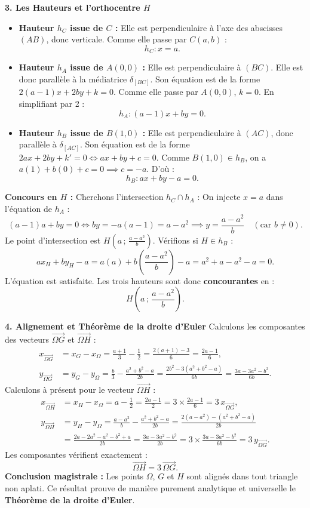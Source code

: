 \documentclass[11pt,a4paper]{article}
\newcommand{\vect}[1]{\overrightarrow{#1}}
\begin{document}
\begin{correctionbox}
\textbf{3. Les Hauteurs et l'orthocentre $H$}
\begin{itemize}[leftmargin=1cm]
    \item \textbf{Hauteur $h_C$ issue de $C$ :} Elle est perpendiculaire à l'axe des abscisses $(AB)$, donc verticale. Comme elle passe par $C(a, b)$ :
    \[
    h_C : x = a.
    \]
    \item \textbf{Hauteur $h_A$ issue de $A(0,0)$ :} Elle est perpendiculaire à $(BC)$. Elle est donc parallèle à la médiatrice $\delta_{[BC]}$. Son équation est de la forme $2(a-1)x + 2by + k = 0$. Comme elle passe par $A(0,0)$, $k = 0$. En simplifiant par 2 :
    \[
    h_A : (a - 1)x + by = 0.
    \]
    \item \textbf{Hauteur $h_B$ issue de $B(1,0)$ :} Elle est perpendiculaire à $(AC)$, donc parallèle à $\delta_{[AC]}$. Son équation est de la forme $2ax + 2by + k' = 0 \iff ax + by + c = 0$.
    Comme $B(1,0) \in h_B$, on a $a(1) + b(0) + c = 0 \implies c = -a$. D'où :
    \[
    h_B : ax + by - a = 0.
    \]
\end{itemize}
\textbf{Concours en $H$ :} Cherchons l'intersection $h_C \cap h_A$ :
On injecte $x = a$ dans l'équation de $h_A$ :
\[
(a - 1)a + by = 0 \iff by = -a(a - 1) = a - a^2 \implies y = \frac{a - a^2}{b} \quad (\text{car } b \neq 0).
\]
Le point d'intersection est $H\left(a \,;\, \frac{a - a^2}{b}\right)$.
Vérifions si $H \in h_B$ :
\[
ax_H + by_H - a = a(a) + b\left(\frac{a - a^2}{b}\right) - a = a^2 + a - a^2 - a = 0.
\]
L'équation est satisfaite. Les trois hauteurs sont donc \textbf{concourantes} en :
\[
H\left(a \,;\, \frac{a - a^2}{b}\right).
\]

\textbf{4. Alignement et Théorème de la droite d'Euler}
Calculons les composantes des vecteurs $\vect{\Omega G}$ et $\vect{\Omega H}$ :
\begin{align*}
x_{\vect{\Omega G}} &= x_G - x_\Omega = \frac{a + 1}{3} - \frac{1}{2} = \frac{2(a+1) - 3}{6} = \frac{2a - 1}{6},\\
y_{\vect{\Omega G}} &= y_G - y_\Omega = \frac{b}{3} - \frac{a^2 + b^2 - a}{2b} = \frac{2b^2 - 3(a^2 + b^2 - a)}{6b} = \frac{3a - 3a^2 - b^2}{6b}.
\end{align*}
Calculons à présent pour le vecteur $\vect{\Omega H}$ :
\begin{align*}
x_{\vect{\Omega H}} &= x_H - x_\Omega = a - \frac{1}{2} = \frac{2a - 1}{2} = 3 \times \frac{2a - 1}{6} = 3\,x_{\vect{\Omega G}},\\
y_{\vect{\Omega H}} &= y_H - y_\Omega = \frac{a - a^2}{b} - \frac{a^2 + b^2 - a}{2b} = \frac{2(a - a^2) - (a^2 + b^2 - a)}{2b} \\
&= \frac{2a - 2a^2 - a^2 - b^2 + a}{2b} = \frac{3a - 3a^2 - b^2}{2b} = 3 \times \frac{3a - 3a^2 - b^2}{6b} = 3\,y_{\vect{\Omega G}}.
\end{align*}
Les composantes vérifient exactement :
\[
\vect{\Omega H} = 3\,\vect{\Omega G}.
\]
\textbf{Conclusion magistrale :} Les points $\Omega$, $G$ et $H$ sont alignés dans tout triangle non aplati. Ce résultat prouve de manière purement analytique et universelle le \textbf{Théorème de la droite d'Euler}.
\end{correctionbox}
\end{document}
